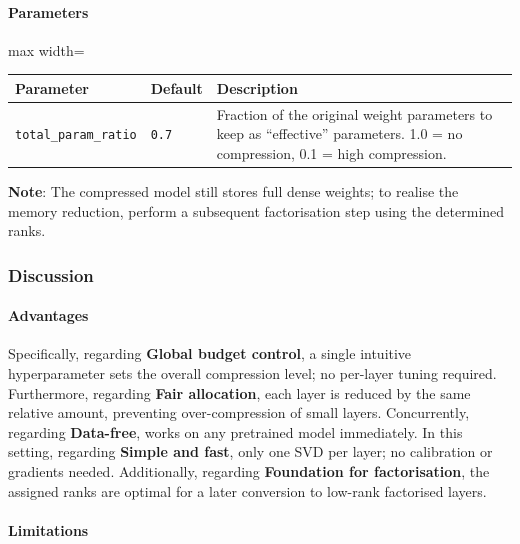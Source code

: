 \paragraph{Parameters}

\begin{center}
\begin{adjustbox}{max width=\columnwidth}
\renewcommand{\arraystretch}{1.2}
\begin{tabular}{lll}
\toprule
Parameter & Default & Description \\
\midrule
\texttt{total\_param\_ratio} & \texttt{0.7} & Fraction of the original weight parameters to keep as ``effective'' parameters. 1.0 = no compression, 0.1 = high compression. \\

\bottomrule
\end{tabular}
\end{adjustbox}
\end{center}
\textbf{Note}: The compressed model still stores full dense weights; to realise the memory reduction, perform a subsequent factorisation step using the determined ranks.


\subsubsection*{Discussion}

\paragraph{Advantages}

Specifically, regarding \textbf{Global budget control}, a single intuitive hyperparameter sets the overall compression level; no per-layer tuning required. Furthermore, regarding \textbf{Fair allocation}, each layer is reduced by the same relative amount, preventing over-compression of small layers. Concurrently, regarding \textbf{Data-free}, works on any pretrained model immediately. In this setting, regarding \textbf{Simple and fast}, only one SVD per layer; no calibration or gradients needed. Additionally, regarding \textbf{Foundation for factorisation}, the assigned ranks are optimal for a later conversion to low-rank factorised layers.


\paragraph{Limitations}


